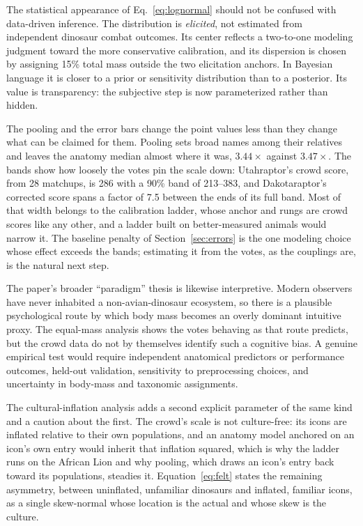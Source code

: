 \documentclass[11pt]{article}
\begin{document}
The statistical appearance of Eq.~\eqref{eq:lognormal} should not be confused with data-driven inference. The distribution is \emph{elicited}, not estimated from independent dinosaur combat outcomes. Its center reflects a two-to-one modeling judgment toward the more conservative calibration, and its dispersion is chosen by assigning 15\% total mass outside the two elicitation anchors. In Bayesian language it is closer to a prior or sensitivity distribution than to a posterior. Its value is transparency: the subjective step is now parameterized rather than hidden.

The pooling and the error bars change the point values less than they change what can be claimed for them. Pooling sets broad names among their relatives and leaves the anatomy median almost where it was, $3.44\times$ against $3.47\times$. The bands show how loosely the votes pin the scale down: Utahraptor's crowd score, from 28 matchups, is 286 with a 90\% band of 213--383, and Dakotaraptor's corrected score spans a factor of 7.5 between the ends of its full band. Most of that width belongs to the calibration ladder, whose anchor and rungs are crowd scores like any other, and a ladder built on better-measured animals would narrow it. The baseline penalty of Section~\ref{sec:errors} is the one modeling choice whose effect exceeds the bands; estimating it from the votes, as the couplings are, is the natural next step.

The paper's broader ``paradigm'' thesis is likewise interpretive. Modern observers have never inhabited a non-avian-dinosaur ecosystem, so there is a plausible psychological route by which body mass becomes an overly dominant intuitive proxy. The equal-mass analysis shows the votes behaving as that route predicts, but the crowd data do not by themselves identify such a cognitive bias. A genuine empirical test would require independent anatomical predictors or performance outcomes, held-out validation, sensitivity to preprocessing choices, and uncertainty in body-mass and taxonomic assignments.

The cultural-inflation analysis adds a second explicit parameter of the same kind and a caution about the first. The crowd's scale is not culture-free: its icons are inflated relative to their own populations, and an anatomy model anchored on an icon's own entry would inherit that inflation squared, which is why the ladder runs on the African Lion and why pooling, which draws an icon's entry back toward its populations, steadies it. Equation~\eqref{eq:felt} states the remaining asymmetry, between uninflated, unfamiliar dinosaurs and inflated, familiar icons, as a single skew-normal whose location is the actual and whose skew is the culture.
\end{document}
